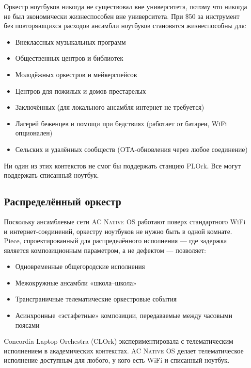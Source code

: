\documentclass[10pt,letterpaper,twocolumn]{article}
\newcommand{\acos}{\textsc{AC Native OS}}
\begin{document}
Оркестр ноутбуков никогда не существовал вне университета, потому что никогда не был экономически жизнеспособен вне университета. При \$50 за инструмент без повторяющихся расходов ансамбли ноутбуков становятся жизнеспособны для:

\begin{itemize}
  \item Внеклассных музыкальных программ
  \item Общественных центров и библиотек
  \item Молодёжных оркестров и мейкерспейсов
  \item Центров для пожилых и домов престарелых
  \item Заключённых (для локального ансамбля интернет не требуется)
  \item Лагерей беженцев и помощи при бедствиях (работает от батареи, WiFi опционален)
  \item Сельских и удалённых сообществ (OTA-обновления через любое соединение)
\end{itemize}

Ни один из этих контекстов не смог бы поддержать станцию PLOrk. Все могут поддержать списанный ноутбук.

\subsection{Распределённый оркестр}

Поскольку ансамблевые сети \acos{} работают поверх стандартного WiFi и интернет-соединений, оркестру ноутбуков не нужно быть в одной комнате. Piece, спроектированный для распределённого исполнения --- где задержка является композиционным параметром, а не дефектом --- позволяет:

\begin{itemize}
  \item Одновременные общегородские исполнения
  \item Межокружные ансамбли «школа--школа»
  \item Трансграничные телематические оркестровые события
  \item Асинхронные «эстафетные» композиции, передаваемые между часовыми поясами
\end{itemize}

Concordia Laptop Orchestra (CLOrk) экспериментировала с телематическим исполнением в академических контекстах. \acos{} делает телематическое исполнение доступным для любого, у кого есть WiFi и списанный ноутбук.
\end{document}
